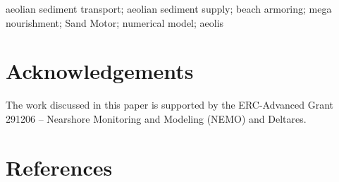 \documentclass[preprint,12pt,authoryear]{elsarticle}
\begin{document}
\begin{frontmatter}
\begin{abstract}
  \end{abstract}

  \begin{keyword}
    aeolian sediment transport; aeolian sediment supply; beach
    armoring; mega nourishment; Sand Motor; numerical model; aeolis
  \end{keyword}

\end{frontmatter}



\section*{Acknowledgements}
The work discussed in this paper is supported by the ERC-Advanced
Grant 291206 -- Nearshore Monitoring and Modeling (NEMO) and Deltares.

\appendix



\section*{References}
{}
\end{document}
